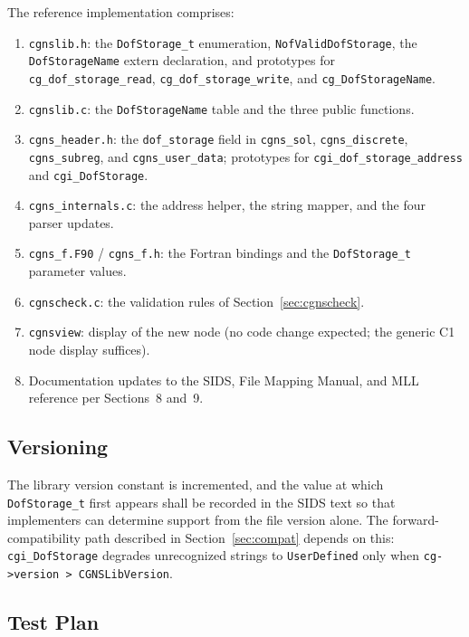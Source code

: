 \documentclass[11pt,letterpaper]{article}
\begin{document}
The reference implementation comprises:

\begin{enumerate}[leftmargin=2em]
\item \texttt{cgnslib.h}: the \texttt{DofStorage\_t} enumeration,
  \texttt{NofValidDofStorage}, the \texttt{DofStorageName} extern
  declaration, and prototypes for
  \texttt{cg\_dof\_storage\_read},
  \texttt{cg\_dof\_storage\_write}, and
  \texttt{cg\_DofStorageName}.
\item \texttt{cgnslib.c}: the \texttt{DofStorageName} table and the
  three public functions.
\item \texttt{cgns\_header.h}: the \texttt{dof\_storage} field in
  \texttt{cgns\_sol}, \texttt{cgns\_discrete}, \texttt{cgns\_subreg},
  and \texttt{cgns\_user\_data}; prototypes for
  \texttt{cgi\_dof\_storage\_address} and \texttt{cgi\_DofStorage}.
\item \texttt{cgns\_internals.c}: the address helper, the string
  mapper, and the four parser updates.
\item \texttt{cgns\_f.F90} / \texttt{cgns\_f.h}: the Fortran bindings
  and the \texttt{DofStorage\_t} parameter values.
\item \texttt{cgnscheck.c}: the validation rules of
  Section~\ref{sec:cgnscheck}.
\item \texttt{cgnsview}: display of the new node (no code change
  expected; the generic C1 node display suffices).
\item Documentation updates to the SIDS, File Mapping Manual, and MLL
  reference per Sections~8 and~9.
\end{enumerate}

\subsection{Versioning}

The library version constant is incremented, and the value at which
\texttt{DofStorage\_t} first appears shall be recorded in the SIDS text
so that implementers can determine support from the file version
alone.  The forward-compatibility path described in
Section~\ref{sec:compat} depends on this: \texttt{cgi\_DofStorage}
degrades unrecognized strings to \texttt{UserDefined} only when
\texttt{cg->version > CGNSLibVersion}.

\subsection{Test Plan}
\end{document}

